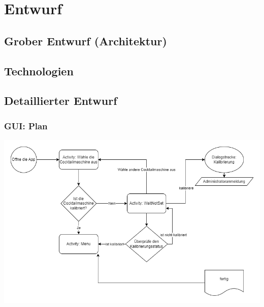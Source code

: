 
\newpage

\chapter{Entwurf} %
\label{cha:entwurf}

\section{Grober Entwurf (Architektur)}
\label{sec:grober_entwurf}

\section{Technologien}
\label{sec:technologien}

\section{Detaillierter Entwurf}
\label{sec:detaillierter_entwurf}

\subsection{GUI: Plan}

\includegraphics[scale=0.30]{Appstart.png}

